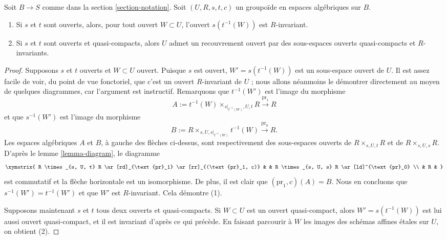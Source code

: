 \begin{lemma}
\label{lemma-constructing-invariant-opens}
Soit $B \to S$ comme dans la section \ref{section-notation}. Soit $(U, R, s, t, c)$ un groupoïde en espaces algébriques sur $B$.
\begin{enumerate}
\item Si $s$ et $t$ sont ouverts, alors, pour tout ouvert $W \subset U$, l'ouvert $s(t^{-1}(W))$ est $R$-invariant.
\item Si $s$ et $t$ sont ouverts et quasi-compacts, alors $U$ admet un recouvrement ouvert par des sous-espaces ouverts quasi-compacts et $R$-invariants.
\end{enumerate}
\end{lemma}

\begin{proof}
Supposons $s$ et $t$ ouverts et $W \subset U$ ouvert. Puisque $s$ est ouvert, $W' = s(t^{-1}(W))$ est un sous-espace ouvert de $U$. Il est assez facile de voir, du point de vue fonctoriel, que c'est un ouvert $R$-invariant de $U$ ; nous allons néanmoins le démontrer directement au moyen de quelques diagrammes, car l'argument est instructif. Remarquons que $t^{-1}(W')$ est l'image du morphisme
$$
A := t^{-1}(W) \times_{s|_{t^{-1}(W)}, U, t} R
\xrightarrow{\text{pr}_1} R
$$
et que $s^{-1}(W')$ est l'image du morphisme
$$
B := R \times_{s, U, s|_{t^{-1}(W)}} t^{-1}(W)
\xrightarrow{\text{pr}_0} R.
$$
Les espaces algébriques $A$ et $B$, à gauche des flèches ci-dessus, sont respectivement des sous-espaces ouverts de $R \times_{s, U, t} R$ et de $R \times_{s, U, s} R$. D'après le lemme \ref{lemma-diagram}, le diagramme
$$
\xymatrix{
R \times_{s, U, t} R \ar[rd]_{\text{pr}_1} \ar[rr]_{(\text{pr}_1, c)} & &
R \times_{s, U, s} R \ar[ld]^{\text{pr}_0} \\
& R &
}
$$
est commutatif et la flèche horizontale est un isomorphisme. De plus, il est clair que $(\text{pr}_1, c)(A) = B$. Nous en concluons que $s^{-1}(W') = t^{-1}(W')$ et que $W'$ est $R$-invariant. Cela démontre (1).

\medskip\noindent
Supposons maintenant $s$ et $t$ tous deux ouverts et quasi-compacts. Si $W \subset U$ est un ouvert quasi-compact, alors $W' = s(t^{-1}(W))$ est lui aussi ouvert quasi-compact, et il est invariant d'après ce qui précède. En faisant parcourir à $W$ les images des schémas affines étales sur $U$, on obtient (2).
\end{proof}






